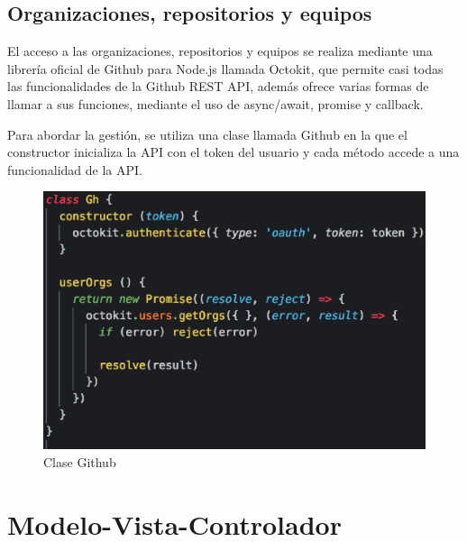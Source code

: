 \subsection{Organizaciones, repositorios y equipos}
\label{3:2:2}

El acceso a las organizaciones, repositorios y equipos se realiza mediante una librería oficial de Github para Node.js
llamada Octokit, que permite casi todas las funcionalidades de la Github REST API, además ofrece varias formas de llamar a sus funciones, mediante 
el uso de async/await, promise y callback.

Para abordar la gestión, se utiliza una clase llamada Github en la que el constructor inicializa la API con el token del usuario y cada método accede a una funcionalidad de la API.

\begin{figure}[!th]
\begin{center}
\includegraphics[scale=0.5]{images/clasegh}
\caption{Clase Github}
\label{fig:Clase Github}
\end{center}
\end{figure}

\section{Modelo-Vista-Controlador}
\label{:sec3}
